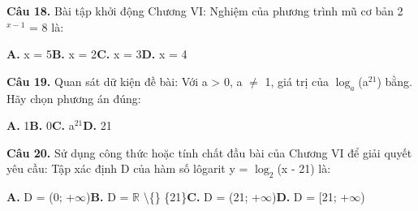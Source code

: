 \documentclass[11pt,a4paper]{article}
\begin{document}
\textbf{\color{primary} Câu 18.} Bài tập khởi động Chương VI: Nghiệm của phương trình mũ cơ bản 2$^{x - 1}$ = 8 là:\par
\hspace*{1.5em}\textbf{A.} x = 5\quad\quad \textbf{B.} x = 2\quad\quad \textbf{C.} x = 3\quad\quad \textbf{D.} x = 4\par\vspace{2pt}
\textbf{\color{primary} Câu 19.} Quan sát dữ kiện đề bài: Với a > 0, a $\ne$ 1, giá trị của $\log_a$(a$^{21}$) bằng. Hãy chọn phương án đúng:\par
\hspace*{1.5em}\textbf{A.} 1\quad\quad \textbf{B.} 0\quad\quad \textbf{C.} a$^{21}$\quad\quad \textbf{D.} 21\par\vspace{2pt}
\textbf{\color{primary} Câu 20.} Sử dụng công thức hoặc tính chất đầu bài của Chương VI để giải quyết yêu cầu: Tập xác định D của hàm số lôgarit y = $\log_2$(x - 21) là:\par
\hspace*{1.5em}\textbf{A.} D = (0; +$\infty$)\quad\quad \textbf{B.} D = $\mathbb{R}$ \textbackslash\{\} \{21\}\quad\quad \textbf{C.} D = (21; +$\infty$)\quad\quad \textbf{D.} D = [21; +$\infty$)\par\vspace{2pt}
\end{document}
